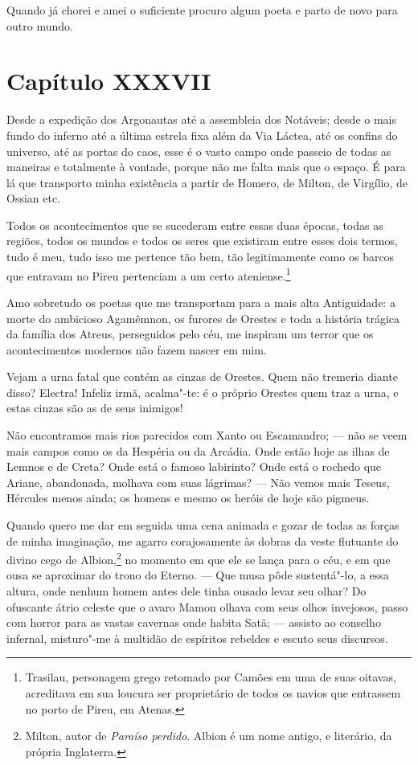  Quando já chorei e amei o suficiente procuro algum poeta e parto de
novo para outro mundo. 

\section*{Capítulo XXXVII}

 Desde a expedição dos Argonautas até a assembleia dos Notáveis; desde o
mais fundo do inferno até a última estrela fixa além da Via Láctea, até
os confins do universo, até as portas do caos, esse é o vasto campo
onde passeio de todas as maneiras  e totalmente à vontade, porque não
me falta mais que o espaço. É para lá que transporto minha existência a
partir de Homero, de Milton, de Virgílio, de Ossian etc.

 Todos os acontecimentos que se sucederam entre essas duas épocas, todas
as regiões, todos os mundos e todos os seres que existiram entre esses
dois termos, tudo é meu, tudo isso me pertence tão bem, tão
legitimamente como os barcos que entravam no Pireu pertenciam a um
certo ateniense.\footnote{ Trasilau, personagem grego retomado por
Camões em uma de suas oitavas, acreditava em sua loucura ser
proprietário de todos os navios que entrassem no porto de Pireu, em Atenas.} 

 Amo sobretudo os poetas que me transportam para a mais alta
Antiguidade: a morte do ambicioso Agamêmnon, os furores de Orestes e
toda a história trágica da família dos Atreus, perseguidos pelo céu, me
inspiram um terror que os acontecimentos modernos não fazem nascer em
mim.

 Vejam a urna fatal que contém as cinzas de Orestes. Quem não tremeria
diante disso? Electra! Infeliz irmã, acalma"-te: é o próprio Orestes
quem traz a urna, e estas cinzas são as de seus inimigos!

 Não encontramos mais rios parecidos com Xanto ou Escamandro; --- não se
veem mais campos como os da Hespéria ou da Arcádia. Onde estão hoje as
ilhas de Lemnos e de Creta? Onde está o famoso labirinto? Onde está o
rochedo que Ariane, abandonada, molhava com suas lágrimas? --- Não
vemos mais Teseus, Hércules menos ainda; os homens e mesmo os heróis de
hoje são pigmeus.

 Quando quero me dar em seguida uma cena animada e gozar de todas as
forças de minha imaginação, me agarro corajosamente às dobras da veste
flutuante do divino cego de Albion,\footnote{ Milton, autor de
\textit{Paraíso perdido}. Albion é um nome antigo, e literário, da
própria Inglaterra.} no momento em que ele se lança para o céu, e
em que ousa se aproximar do trono do Eterno. --- Que musa pôde
sustentá"-lo, a essa altura, onde nenhum homem antes dele tinha ousado
levar seu olhar? Do ofuscante átrio celeste que o avaro Mamon olhava
com seus olhos invejosos, passo com horror para as vastas cavernas onde
habita Satã; --- assisto ao conselho infernal, misturo"-me à multidão de
espíritos rebeldes e escuto seus discursos.

